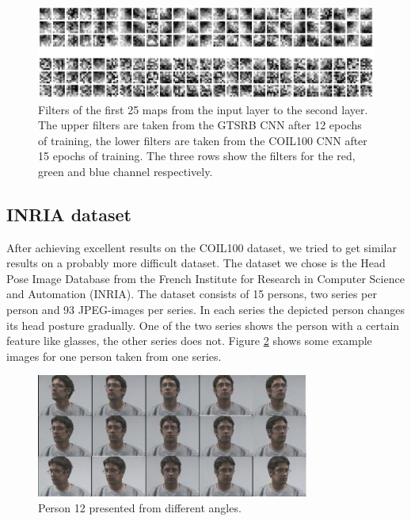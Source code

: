 \documentclass[11pt, a4paper]{article}
\begin{document}
\begin{figure}[h!]
	\centering
	\includegraphics[width=1\textwidth]{gtsrb_vs_coil_filters.png}
	\caption{Filters of the first 25 maps from the input layer to the second layer. The upper filters are taken from the GTSRB CNN after 12 epochs of training, the lower filters are taken from the COIL100 CNN after 15 epochs of training. The three rows show the filters for the red, green and blue channel respectively.}
	\label{fig:gtsrb_vs_coil_filters}
\end{figure}







\subsection{INRIA dataset}
\label{subsec:inria}

After achieving excellent results on the COIL100 dataset, we tried to get similar results on a probably more difficult dataset. The dataset we chose is the Head Pose Image Database \cite{estimating-face-orientation-inria} from the French Institute for Research in Computer Science and Automation (INRIA). The dataset consists of 15 persons, two series per person and 93 JPEG-images per series. In each series the depicted person changes its head posture gradually. One of the two series shows the person with a certain feature like glasses, the other series does not. Figure \ref{fig:inria_different_angles} shows some example images for one person taken from one series.

\begin{figure}[h!]
	\centering
	\includegraphics[width=0.8\textwidth]{inria_different_angles}
	\caption{Person 12 presented from different angles.}
	\label{fig:inria_different_angles}
\end{figure}
\end{document}
